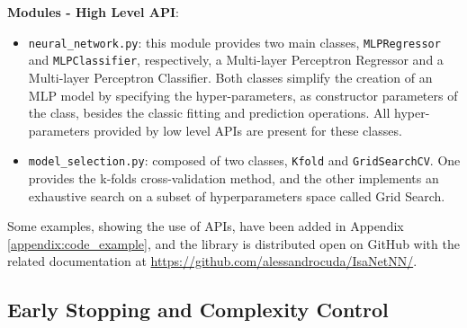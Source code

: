 \documentclass[11pt]{article}
\begin{document}
\noindent\textbf{Modules -  High Level API}:
\begin{itemize}
    \item \texttt{neural\_network.py}: this module provides two main classes, \texttt{MLPRegressor} and \texttt{MLPClassifier}, respectively, a Multi-layer Perceptron Regressor and a Multi-layer Perceptron Classifier. Both classes simplify the creation of an MLP model by specifying the hyper-parameters, as constructor parameters of the class, besides
    the classic fitting and prediction operations. All hyper-parameters provided by low level APIs are present for these classes.
    
    \item \texttt{model\_selection.py}: composed of two classes, \texttt{Kfold} and \texttt{GridSearchCV}. One provides the k-folds cross-validation method, and the other implements an exhaustive search on a subset of hyperparameters space called Grid Search.

\end{itemize}
Some examples, showing the use of APIs, have been added in Appendix \ref{appendix:code_example}, and the library is distributed open on GitHub with the related documentation at \href{https://github.com/alessandrocuda/IsaNetNN/}{https://github.com/alessandrocuda/IsaNetNN/}. 

\subsection{Early Stopping and Complexity Control}
\label{sec:early_stop}
\end{document}
